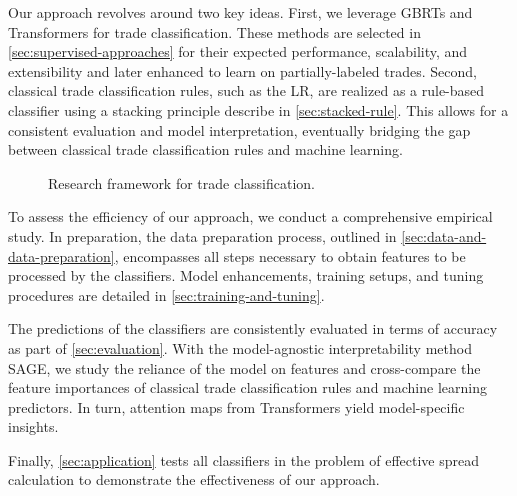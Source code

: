 Our approach revolves around two key ideas. First, we leverage \glspl{GBRT} and Transformers for trade classification. These methods are selected in \cref{sec:supervised-approaches} for their expected performance, scalability, and extensibility and later enhanced to learn on partially-labeled trades. Second, classical trade classification rules, such as the \gls{LR}, are realized as a rule-based classifier using a stacking principle describe in \cref{sec:stacked-rule}. This allows for a consistent evaluation and model interpretation, eventually bridging the gap between classical trade classification rules and machine learning.

\begin{figure}[!ht]
    \centering
    {\renewcommand\normalsize{\tiny}
        \normalsize
        }
    \caption[Research Framework]{Research framework for trade classification.}
    \label{fig:research-framework}
\end{figure}

To assess the efficiency of our approach, we conduct a comprehensive empirical study. In preparation, the data preparation process, outlined in \cref{sec:data-and-data-preparation}, encompasses all steps necessary to obtain features to be processed by the classifiers. Model enhancements, training setups, and tuning procedures are detailed in \cref{sec:training-and-tuning}. 

The predictions of the classifiers are consistently evaluated in terms of accuracy as part of \cref{sec:evaluation}. With the model-agnostic interpretability method \gls{SAGE}, we study the reliance of the model on features and cross-compare the feature importances of classical trade classification rules and machine learning predictors. In turn, attention maps from Transformers yield model-specific insights.

Finally, \cref{sec:application} tests all classifiers in the problem of effective spread calculation to demonstrate the effectiveness of our approach.
